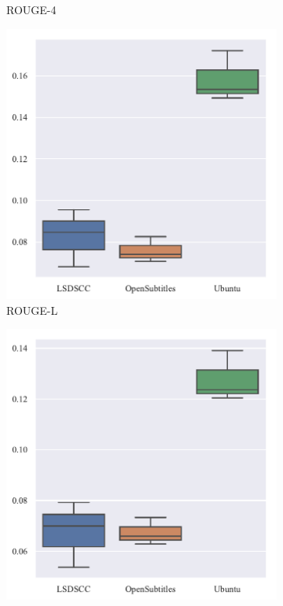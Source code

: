 \begin{figure}[H]
\begin{subfigure}{0.23\linewidth}
        \caption{ROUGE-4}
    \end{subfigure}
    \begin{subfigure}{0.23\linewidth}
        \centering
        \includegraphics[width=\linewidth]{figure/boxplot/dataset/rouge_l/plot.pdf}
        \caption{ROUGE-L}
    \end{subfigure}%
    \begin{subfigure}{0.23\linewidth}
        \centering
        \includegraphics[width=\linewidth]{figure/boxplot/dataset/rouge_w/plot.pdf}

\end{subfigure}
\end{figure}
